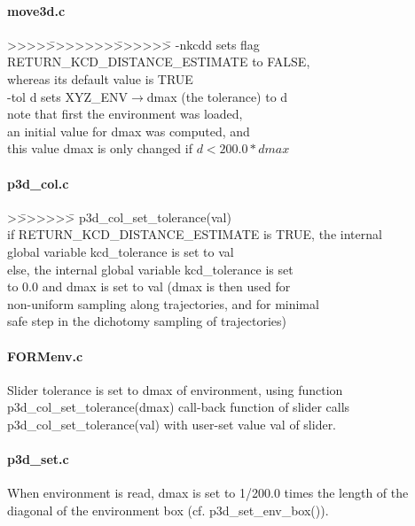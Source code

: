 \paragraph{move3d.c}
\begin{tabbing}
\vspace{-5mm}
>>>>\=>>>>>>>\=>>>>>>\= \kill
\>-nkcdd \> \>sets flag RETURN\_KCD\_DISTANCE\_ESTIMATE to FALSE,\\
\>\>\>        whereas its default value is TRUE\\
\>-tol \>d  \>sets XYZ\_ENV$\rightarrow$dmax (the tolerance) to  d  \\
\>\>\>        note that first the environment was loaded,\\
\>\>\>        an initial value for dmax was computed, and\\
\>\>\>        this value dmax is only changed if $d < 200.0*dmax$
\vspace{-4mm}
\end{tabbing}
\paragraph{p3d\_col.c}
\begin{tabbing}
\vspace{-5mm}
>\=>>>>>>\= \kill
p3d\_col\_set\_tolerance(val)\\
\>        if RETURN\_KCD\_DISTANCE\_ESTIMATE is TRUE, the internal\\
\>        global variable kcd\_tolerance is set to val\\
\>        else, the internal global variable kcd\_tolerance is set\\
\>        to 0.0 and dmax is set to val (dmax is then used for \\
\>        non-uniform sampling along trajectories, and for minimal\\
\>        safe step in the dichotomy sampling of trajectories)
\vspace{-4mm}
\end{tabbing}
\paragraph{FORMenv.c}
 Slider tolerance is set to dmax of environment, using
 function p3d\_col\_set\_tolerance(dmax)
 call-back function of slider calls p3d\_col\_set\_tolerance(val)
 with user-set value val of slider.
\paragraph{p3d\_set.c}
 When environment is read, dmax is set to 1/200.0 times the
 length of the diagonal of the environment box (cf. p3d\_set\_env\_box()).
